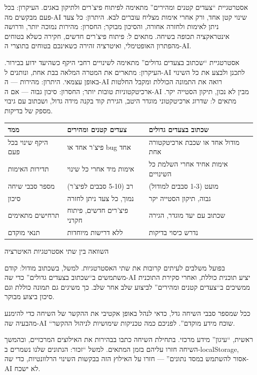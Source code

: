 אסטרטגיית “צעדים קטנים ומהירים” מתאימה לפיתוח פיצ'רים ולתיקון באגים. העיקרון: בכל פעם מבקשים מה-AI שינוי קטן אחד, ורק אחרי אימות מצליח עוברים לבא. היתרון: כל צעד ניתן לאימות ולחזרה אחורה, והסיכון מבוקר; החסרון: מהירות נמוכה יותר, ודרושה אינטראקציה תכופה בשיחה. מתאים ל: פיתוח פיצ'רים חדשים, חקירה כשלא בטוחים מהפתרון האופטימלי, ואיטרציה זהירה כשאינכם בטוחים בתוצרי ה-AI.

אסטרטגיית “שכתוב בצעדים גדולים” מתאימה לשינויים רחבי היקף כשהיעד ידוע בבירור. העיקרון: מתארים את המטרה המלאה בבת אחת, ונותנים ל-AI לתכנן ולבצע את כל השינוי באופן עצמאי. היתרון: מהירות — ה-AI רואה את התמונה הכוללת ומקבל החלטות ארכיטקטוניות טובות יותר; החסרון: סיכון גבוה — אם ה-AI מבין לא נכון, תיקון הסטייה יקר. מתאים ל: שדרוג ארכיטקטוני מוגדר היטב, הגירת קוד בקנה מידה גדול, ושכתוב עם גיבוי מספק של בדיקות.

\begin{center}
\begin{tabularx}{\linewidth}{|X|X|X|}
\hline
\textbf{ממד} & \textbf{צעדים קטנים ומהירים} & \textbf{שכתוב בצעדים גדולים} \tabularnewline
\hline
היקף שינוי בכל פעם & פיצ'ר אחד או bug אחד & מודול אחד או שכבת ארכיטקטורה אחת \tabularnewline
תדירות האימות & אימות מיד אחרי כל שינוי & אימות אחיד אחרי השלמת כל השינויים \tabularnewline
מספר סבבי שיחה & רב (5-10 סבבים לפיצ'ר) & מועט (1-3 סבבים למודול) \tabularnewline
סיכון & נמוך, כל צעד ניתן לחזרה & גבוה, תיקון הסטייה יקר \tabularnewline
תרחישים מתאימים & פיצ'רים חדשים, פיתוח חקרני & שכתוב עם יעד מוגדר, הגירה \tabularnewline
תנאי מוקדם & ללא דרישות מיוחדות & נדרש כיסוי בדיקות \tabularnewline
\hline
\end{tabularx}
\end{center}

\begin{center}\small\color{gray}השוואה בין שתי אסטרטגיות האיטרציה\end{center}

בפועל משלבים לעיתים קרובות את שתי האסטרטגיות. למשל, בשכתוב מודול: קודם משתמשים ב“שכתוב בצעדים גדולים” כדי שה-AI יציע תוכנית כוללת, ואחרי סקירת התוכנית ממשיכים ב“צעדים קטנים ומהירים” לביצוע שלב אחר שלב. כך משיגים גם תמונה כוללת וגם סיכון ביצוע מבוקר.


ככל שמספר סבבי השיחה גדל, כדאי לנהל באופן אקטיבי את ההקשר של השיחה כדי להימנע מהבעיה שה-AI “שוכח מידע מוקדם”. לפניכם כמה טכניקות שימושיות לניהול ההקשר.

ראשית, “עיגון” מידע מרכזי. בתחילת השיחה כתבו בבהירות את האילוצים המרכזיים, ובהמשך השיחה חזרו עליהם בזמן המתאים. למשל “זכור: הנתונים שלנו נשמרים ב-localStorage, אסור להשתמש במסד נתונים” — חזרו על האילוץ הזה בבקשות השינוי הרלוונטיות, כדי שה-AI לא ישכח.


